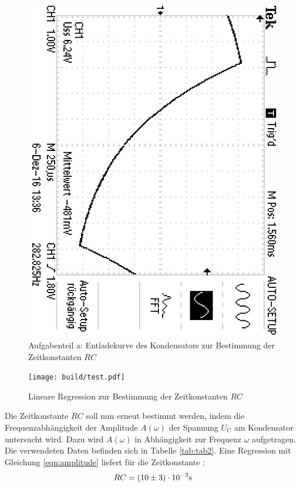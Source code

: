 \begin{figure}
	\centering
	\includegraphics[angle=90]{bilder/F0000TEK.JPG}
	\caption{Aufgabenteil a: Entladekurve des Kondensators zur Bestimmung der Zeitkonstanten $RC$}
	\label{fig:plotrc}
\end{figure}

\begin{figure}
	\centering
	\texttt{[image: build/test.pdf]}
	\caption{Lineare Regression zur Bestimmung der Zeitkonstanten $RC$}
	\label{fig:plota}
\end{figure}

Die Zeitkonstante $RC$ soll nun erneut bestimmt werden, indem die Frequenzabhängigkeit der Amplitude $A(\omega)$ der Spannung $U_\text{C}$ am Kondensator untersucht wird.
Dazu wird $A(\omega)$ in Abhängigkeit zur Frequenz $\omega$ aufgetragen. Die verwendeten Daten befinden sich in Tabelle \ref{tab:tab2}.
Eine Regression mit Gleichung \eqref{eqn:amplitude} liefert für die Zeitkonstante :
\begin{equation*}
	\centering
	RC=(10 \pm 3)\cdot 10^{-3} \si{\second}
\end{equation*}

